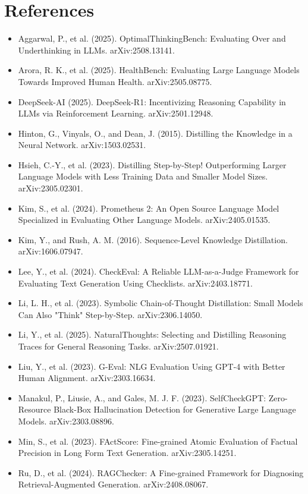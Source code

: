 \documentclass[11pt]{article}
\begin{document}
\section{References}
\begingroup\small
\begin{itemize}\setlength{\itemsep}{2pt}
\item Aggarwal, P., et al. (2025). OptimalThinkingBench: Evaluating Over and Underthinking in LLMs. arXiv:2508.13141.
\item Arora, R. K., et al. (2025). HealthBench: Evaluating Large Language Models Towards Improved Human Health. arXiv:2505.08775.
\item DeepSeek-AI (2025). DeepSeek-R1: Incentivizing Reasoning Capability in LLMs via Reinforcement Learning. arXiv:2501.12948.
\item Hinton, G., Vinyals, O., and Dean, J. (2015). Distilling the Knowledge in a Neural Network. arXiv:1503.02531.
\item Hsieh, C.-Y., et al. (2023). Distilling Step-by-Step! Outperforming Larger Language Models with Less Training Data and Smaller Model Sizes. arXiv:2305.02301.
\item Kim, S., et al. (2024). Prometheus 2: An Open Source Language Model Specialized in Evaluating Other Language Models. arXiv:2405.01535.
\item Kim, Y., and Rush, A. M. (2016). Sequence-Level Knowledge Distillation. arXiv:1606.07947.
\item Lee, Y., et al. (2024). CheckEval: A Reliable LLM-as-a-Judge Framework for Evaluating Text Generation Using Checklists. arXiv:2403.18771.
\item Li, L. H., et al. (2023). Symbolic Chain-of-Thought Distillation: Small Models Can Also "Think" Step-by-Step. arXiv:2306.14050.
\item Li, Y., et al. (2025). NaturalThoughts: Selecting and Distilling Reasoning Traces for General Reasoning Tasks. arXiv:2507.01921.
\item Liu, Y., et al. (2023). G-Eval: NLG Evaluation Using GPT-4 with Better Human Alignment. arXiv:2303.16634.
\item Manakul, P., Liusie, A., and Gales, M. J. F. (2023). SelfCheckGPT: Zero-Resource Black-Box Hallucination Detection for Generative Large Language Models. arXiv:2303.08896.
\item Min, S., et al. (2023). FActScore: Fine-grained Atomic Evaluation of Factual Precision in Long Form Text Generation. arXiv:2305.14251.
\item Ru, D., et al. (2024). RAGChecker: A Fine-grained Framework for Diagnosing Retrieval-Augmented Generation. arXiv:2408.08067.

\end{itemize}
\end{document}
